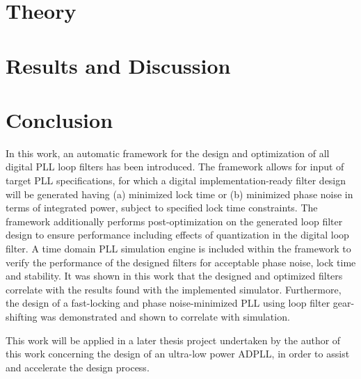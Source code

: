 	\section{Theory}\label{theory}
	
	

	\pagebreak
	
	\pagebreak

	\section{Results and Discussion}\label{disco}
    

    \FloatBarrier

    \pagebreak
    \section{Conclusion} \label{conclusion}
    In this work, an automatic framework for the design and optimization of all digital PLL loop filters has been introduced. The framework allows for input of target PLL specifications, for which a digital implementation-ready filter design will be generated having (a) minimized lock time or (b) minimized phase noise in terms of integrated power, subject to specified lock time constraints. The framework additionally performs post-optimization on the generated loop filter design to ensure performance including effects of quantization in the digital loop filter. A time domain PLL simulation engine is included within the framework to verify the performance of the designed filters for acceptable phase noise, lock time and stability. It was shown in this work that the designed and optimized filters correlate with the results found with the implemented simulator. Furthermore, the design of a fast-locking and phase noise-minimized PLL using loop filter gear-shifting was demonstrated and shown to correlate with simulation.

    This work will be applied in a later thesis project undertaken by the author of this work concerning the design of an ultra-low power ADPLL, in order to assist and accelerate the design process. 

    \pagebreak
	\printbibliography


	\pagebreak
	


